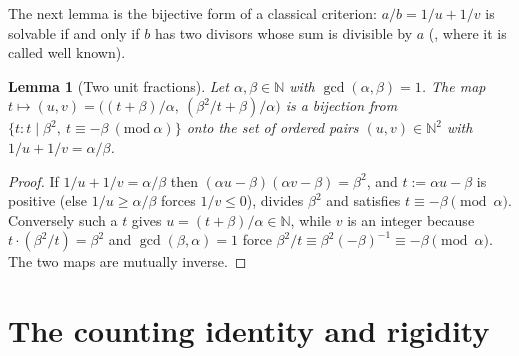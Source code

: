 \documentclass[11pt,reqno]{amsart}
\theoremstyle{plain}
\newtheorem{lemma}[theorem]{Lemma}
\theoremstyle{definition}
\numberwithin{equation}{section}
\newcommand{\N}{\mathbb{N}}
\begin{document}
The next lemma is the bijective form of a classical criterion: $a/b=1/u+1/v$ is
solvable if and only if $b$ has two divisors whose sum is divisible by $a$
(\cite[Thm.~2.2]{MonksVelingker}, where it is called well known).

\begin{lemma}[Two unit fractions]\label{lem:two}
Let $\alpha,\beta\in\N$ with $\gcd(\alpha,\beta)=1$. The map
$t\mapsto(u,v)=\bigl((t+\beta)/\alpha,\ (\beta^{2}/t+\beta)/\alpha\bigr)$ is a
bijection from $\{t: t\mid\beta^{2},\ t\equiv-\beta\ (\mathrm{mod}\ \alpha)\}$ onto
the set of ordered pairs $(u,v)\in\N^{2}$ with $1/u+1/v=\alpha/\beta$.
\end{lemma}

\begin{proof}
If $1/u+1/v=\alpha/\beta$ then $(\alpha u-\beta)(\alpha v-\beta)=\beta^{2}$, and
$t:=\alpha u-\beta$ is positive (else $1/u\ge\alpha/\beta$ forces $1/v\le0$),
divides $\beta^{2}$ and satisfies $t\equiv-\beta \pmod\alpha$. Conversely such a $t$
gives $u=(t+\beta)/\alpha\in\N$, while $v$ is an integer because
$t\cdot(\beta^{2}/t)=\beta^{2}$ and $\gcd(\beta,\alpha)=1$ force
$\beta^{2}/t\equiv\beta^{2}(-\beta)^{-1}\equiv-\beta\pmod\alpha$. The two maps are
mutually inverse.
\end{proof}

\section{The counting identity and rigidity}\label{sec:count}
\end{document}
